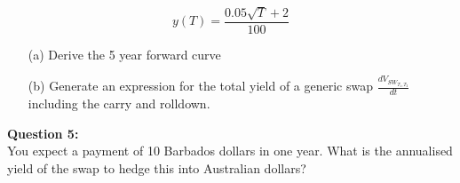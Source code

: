 \[ y(T) = \frac{0.05\sqrt{T}+2}{100}\]

\begin{itemize}
\item[(a)] Derive the 5 year forward curve
\item[(b)] Generate an expression for the total yield of a generic swap $\frac{d V_{SW_{T_1,T_2} } }{d t}$ including the carry and rolldown. %
\end{itemize}

\textbf{Question 5:}\\

You expect a payment of 10 Barbados dollars in one year. What is the annualised yield of the swap to hedge this into Australian dollars? 















 
